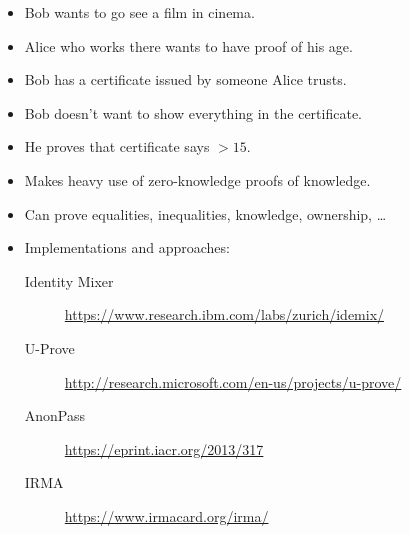 \begin{frame}
  \begin{example}
    \begin{itemize}
      \item Bob wants to go see a film in cinema.
      \item Alice who works there wants to have proof of his age.
      
        \pause

      \item Bob has a certificate issued by someone Alice trusts.
      \item Bob doesn't want to show everything in the certificate.
      \item He proves that certificate says \(> 15\).
    \end{itemize}
  \end{example}
\end{frame}

\begin{frame}
  \begin{example}
    \begin{itemize}
      \item Makes heavy use of zero-knowledge proofs of knowledge.
      \item Can prove equalities, inequalities, knowledge, ownership, \dots
      \item Implementations and approaches:
        \begin{description}
          \item[Identity Mixer]
            \url{https://www.research.ibm.com/labs/zurich/idemix/}
          \item[U-Prove]
            \url{http://research.microsoft.com/en-us/projects/u-prove/}
          \item[AnonPass]
            \url{https://eprint.iacr.org/2013/317}
          \item[IRMA]
            \url{https://www.irmacard.org/irma/}
        \end{description}
    \end{itemize}
  \end{example}
\end{frame}




\begin{frame}[allowframebreaks]
	\small
  \printbibliography{}
\end{frame}

